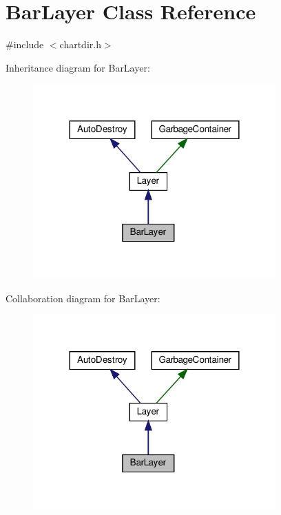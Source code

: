 \hypertarget{class_bar_layer}{}\section{Bar\+Layer Class Reference}
\label{class_bar_layer}


{\ttfamily \#include $<$chartdir.\+h$>$}



Inheritance diagram for Bar\+Layer\+:
\nopagebreak
\begin{figure}[H]
\begin{center}
\leavevmode
\includegraphics[width=264pt]{class_bar_layer__inherit__graph}
\end{center}
\end{figure}


Collaboration diagram for Bar\+Layer\+:
\nopagebreak
\begin{figure}[H]
\begin{center}
\leavevmode
\includegraphics[width=264pt]{class_bar_layer__coll__graph}
\end{center}
\end{figure}
